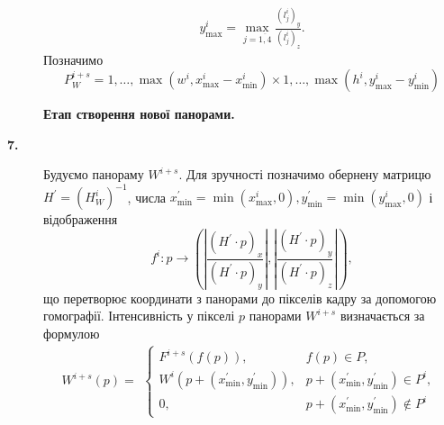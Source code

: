 \begin{description}
\begin{multline*}
            y_{\max}^{i} = \max_{j = \overline{1,4}}\frac{( l_{j}^{i} )_{y}}{( l_{j}^{i} )_{z}}.
        \end{multline*}
        Позначимо
        \begin{equation*}
            P_{W}^{i + s} =
            { 1,\ldots,\max( w^{i},x_{\max}^{i} - x_{\min}^{i} ) }
            \times
            { 1,\ldots,\max( h^{i},y_{\max}^{i} - y_{\min}^{i} ) }
        \end{equation*}
    \item[] \textbf{Етап створення нової панорами.}
    \item[\textbf{7.}]
        Будуємо панораму $W^{i+s}$. Для зручності позначимо обернену матрицю \\
        $H^{'} = (H_{W}^{i})^{-1}$, числа
        $x_{\min}^{'} = \min(x_{\max}^{i}, 0), y_{\min}^{'} = \min(y_{\max}^{i}, 0)$ і відображення
        \begin{equation*}
            f^i: p \rightarrow
            (|\frac{(H^{'} \cdot p)_x}{(H^{'} \cdot p)_y}|, |\frac{(H^{'} \cdot p)_y}{(H^{'} \cdot p)_z}|),
        \end{equation*}
        що перетворює координати з панорами до пікселів кадру за допомогою гомографії.
        Інтенсивність у пікселі $p$ панорами
        $W^{i+s}$ визначається за формулою
        \begin{equation*}
            W^{i + s}(p) =
            \begin{gathered}
                \begin{cases}
                    F^{i + s}(f(p)),                            & f(p) \in P,                                    \\
                    W^{i}( p + ( x_{\min}^{'},y_{\min}^{'} ) ), & p + ( x_{\min}^{'},y_{\min}^{'} ) \in P^{i},   \\
                    0,                                          & p + ( x_{\min}^{'},y_{\min}^{'} ) \notin P^{i}
                \end{cases}
            \end{gathered}
        \end{equation*}
\end{description}

\clearpage
